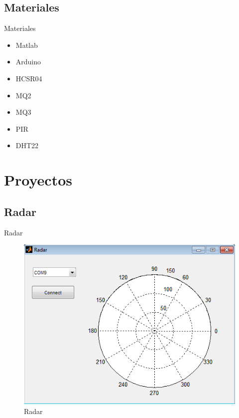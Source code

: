 \documentclass[fleqn,xcolor=dvipsnames,8pt]{beamer} %
\begin{document}
\subsection{Materiales}
\begin{frame}{Materiales}
\begin{itemize}
\item Matlab
\item Arduino
\item HCSR04
\item MQ2
\item MQ3
\item PIR
\item DHT22
\end{itemize}
\end{frame}
\section{Proyectos}
\subsection{Radar}
\begin{frame}{Radar}
\begin{figure}
\centering
\includegraphics[height=0.6\textheight]{images/radar.png}
\caption{Radar}
\end{figure}
\end{frame}
\end{document}
